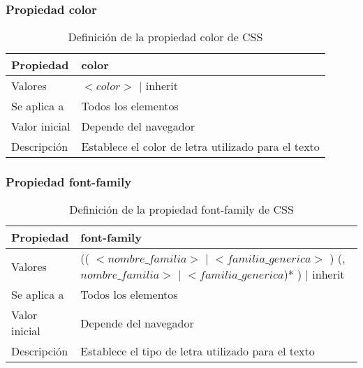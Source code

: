 
\begin{frame}
\frametitle{Propiedad color}

\begin{center}
  \begin{table}
   \begin{tabular}{p{1.8cm}p{7.8cm}}
Propiedad & \bf{color} \\ \hline
Valores& $<color>$ | inherit \\ \hline
Se aplica a& Todos los elementos \\ \hline
Valor inicial& Depende del navegador \\ \hline
Descripción& Establece el color de letra utilizado para el texto \\ \hline
  \end{tabular}
   \caption{Definición de la propiedad color de CSS}
 \end{table}
\end{center}


\end{frame}



\begin{frame}
\frametitle{Propiedad font-family}

\begin{center}
  \begin{table}
   \begin{tabular}{p{1.8cm}p{7.8cm}}
Propiedad & \bf{font-family} \\ \hline
Valores& (( $<nombre\_familia>$ | $<familia\_generica>$ ) (,$nombre\_familia>$ | $<familia\_generica$)* ) | inherit \\ \hline
Se aplica a& Todos los elementos \\ \hline
Valor inicial& Depende del navegador \\ \hline
Descripción& Establece el tipo de letra utilizado para el texto \\ \hline
  \end{tabular}
   \caption{Definición de la propiedad font-family de CSS}
 \end{table}
\end{center}


\end{frame}



